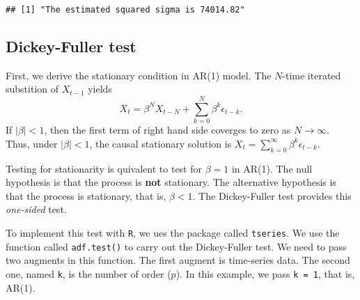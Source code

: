 \documentclass[
  12pt,
]{article}
\newenvironment{Shaded}{\begin{snugshade}}{\end{snugshade}}
\newcommand{\DataTypeTok}[1]{\textcolor[rgb]{0.13,0.29,0.53}{#1}}
\newcommand{\DecValTok}[1]{\textcolor[rgb]{0.00,0.00,0.81}{#1}}
\newcommand{\KeywordTok}[1]{\textcolor[rgb]{0.13,0.29,0.53}{\textbf{#1}}}
\newcommand{\NormalTok}[1]{#1}
\newcommand{\OperatorTok}[1]{\textcolor[rgb]{0.81,0.36,0.00}{\textbf{#1}}}
\newcommand{\StringTok}[1]{\textcolor[rgb]{0.31,0.60,0.02}{#1}}
\begin{document}
\begin{Shaded}
\end{Shaded}

\begin{verbatim}
## [1] "The estimated squared sigma is 74014.82"
\end{verbatim}

\hypertarget{dickey-fuller-test}{%
\subsection{Dickey-Fuller test}\label{dickey-fuller-test}}

First, we derive the stationary condition in AR(1) model. The \(N\)-time
iterated substition of \(X_{t-1}\) yields
\[ X_t = \beta^N X_{t-N} + \sum_{k = 0}^N \beta^k \epsilon_{t-k}. \] If
\(|\beta| < 1\), then the first term of right hand side coverges to zero
as \(N \to \infty\). Thus, under \(|\beta| < 1\), the causal stationary
solution is \(X_t = \sum_{k=0}^{\infty} \beta^k \epsilon_{t-k}\).

Testing for stationarity is quivalent to test for \(\beta = 1\) in
AR(1). The null hypothesis is that the process is \textbf{not}
stationary. The alternative hypothesis is that the process is
stationary, that is, \(\beta < 1\). The Dickey-Fuller test provides this
\emph{one-sided} test.

To implement this test with \texttt{R}, we ues the package called
\texttt{tseries}. We use the function called \texttt{adf.test()} to
carry out the Dickey-Fuller test. We need to pass two augments in this
function. The first augment is time-series data. The second one, named
\texttt{k}, is the number of order (\(p\)). In this example, we pass
\texttt{k\ =\ 1}, that is, AR(1).

\begin{Shaded}
\end{Shaded}
\end{document}
